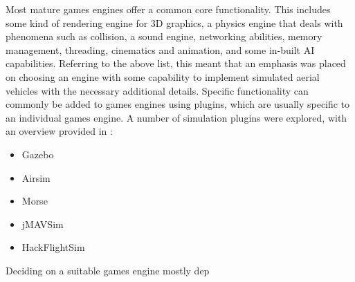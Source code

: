 Most mature games engines offer a common core functionality. This includes some kind of rendering engine for 3D graphics, a physics engine that deals with phenomena such as collision, a sound engine, networking abilities, memory management, threading, cinematics and animation, and some in-built AI capabilities. Referring to the above list, this meant that an emphasis was placed on choosing an engine with some capability to implement simulated aerial vehicles with the necessary additional details. Specific functionality can commonly be added to games engines using plugins, which are usually specific to an individual games engine. A number of simulation plugins were explored, with an overview provided in \cite{Ebeid2018ASimulators}: 
\begin{itemize}
    \item Gazebo
    \item Airsim
    \item Morse
    \item jMAVSim
    \item HackFlightSim
\end{itemize}
    

Deciding on a suitable games engine mostly dep